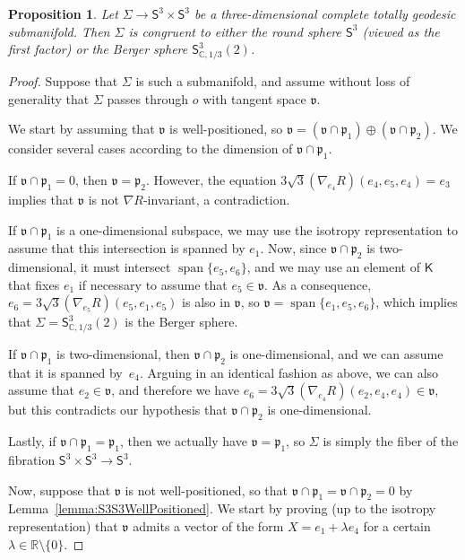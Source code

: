\documentclass[11pt,a4paper,final]{amsart}
\newcommand{\g}{\mathfrak}
\newcommand{\R}{\mathbb{R}}
\newcommand{\C}{\mathbb{C}}
\newcommand{\vecspan}{\operatorname{span}}
\newtheorem{proposition}[theorem]{Proposition}
\theoremstyle{definition}
\begin{document}
\begin{proposition}\label{prop:3tgs3s3}
	Let $\Sigma\to\mathsf{S}^{3}\times\mathsf{S}^{3}$ be a three-dimensional complete totally geodesic submanifold. 
	Then $\Sigma$ is congruent to either the round sphere $\mathsf{S}^{3}$ (viewed as the first factor) or the Berger sphere $\mathsf{S}^{3}_{\C,1/3}(2)$.
\end{proposition}
\begin{proof}
	Suppose that $\Sigma$ is such a submanifold, and assume without loss of generality that $\Sigma$ passes through $o$ with tangent space $\g{v}$.

	We start by assuming that $\g{v}$ is well-positioned, so $\g{v}=(\g{v}\cap\g{p}_{1})\oplus(\g{v}\cap\g{p}_{2})$.
	We consider several cases according to the dimension of $\g{v}\cap \g{p}_{1}$.
		
	If $\g{v}\cap\g{p}_{1}=0$, then $\g{v}=\g{p}_{2}$.
	However, the equation $3\sqrt{3}(\nabla_{e_{4}}R)(e_{4},e_{5},e_{4})=e_{3}$ implies that $\g{v}$ is not $\nabla R$-invariant, a contradiction.
	
	If $\g{v}\cap \g{p}_{1}$ is a one-dimensional subspace, we may use the isotropy representation to assume that this intersection is spanned by $e_{1}$.
	Now, since $\g{v}\cap\g{p}_{2}$ is two-dimensional, it must intersect $\vecspan\{e_{5},e_{6}\}$, and we may use an element of $\mathsf{K}$ that fixes $e_{1}$ if necessary to assume that $e_{5}\in \g{v}$.
	As a consequence, $e_{6}=3\sqrt{3}(\nabla_{e_{5}}R)(e_{5},e_{1},e_{5})$ is also in $\g{v}$, so $\g{v}=\vecspan\{e_{1},e_{5},e_{6}\}$, which implies that $\Sigma=\mathsf{S}^{3}_{\C,1/3}(2)$ is the Berger sphere.
	
	If $\g{v}\cap \g{p}_{1}$ is two-dimensional, then $\g{v}\cap \g{p}_{2}$ is one-dimensional, and we can assume that it is spanned by~$e_{4}$.
	Arguing in an identical fashion as above, we can also assume that $e_{2}\in \g{v}$, and therefore we have $e_{6}=3\sqrt{3}(\nabla_{e_{4}} R)(e_{2},e_{4},e_{4})\in \g{v}$, but this contradicts our hypothesis that $\g{v}\cap\g{p}_{2}$ is one-dimensional.
		
	Lastly, if $\g{v}\cap \g{p}_{1}=\g{p}_{1}$, then we actually have $\g{v}=\g{p}_{1}$, so $\Sigma$ is simply the fiber of the fibration $\mathsf{S}^{3}\times\mathsf{S}^{3}\to\mathsf{S}^{3}$.
		
	Now, suppose that $\g{v}$ is not well-positioned, so that $\g{v}\cap \g{p}_{1}=\g{v}\cap \g{p}_{2}=0$ by Lemma~\ref{lemma:S3S3WellPositioned}.
	We start by proving (up to the isotropy representation) that $\g{v}$ admits a vector of the form $X=e_{1}+\lambda e_{4}$ for a certain $\lambda \in \R\setminus\{0\}$.
		

\end{proof}
\end{document}
